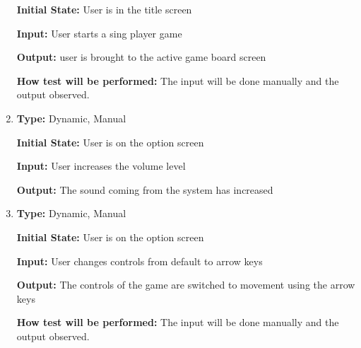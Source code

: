 \documentclass[12pt, titlepage]{article}
\begin{document}
\begin{enumerate}[{FR-UI-}1. ]
		\textbf{Initial State:} User is in the title screen 
		
		\textbf{Input:} User starts a sing player game
		
		\textbf{Output:} user is brought to the active game board screen
		
		\textbf{How test will be performed:} The input will be done manually and the output observed.
		
		\item
		\textbf{Type:} Dynamic, Manual
		
		\textbf{Initial State:} User is on the option screen
		
		\textbf{Input:} User increases the volume level
		
		\textbf{Output:} The sound coming from the system has increased
		
		\item
		\textbf{Type:} Dynamic, Manual
		
		\textbf{Initial State:} User is on the option screen
		
		\textbf{Input:} User changes controls from default to arrow keys
		
		\textbf{Output:} The controls of the game are switched to movement using the arrow keys
		
		\textbf{How test will be performed:} The input will be done manually and the output observed.
	\end{enumerate}
\end{document}
